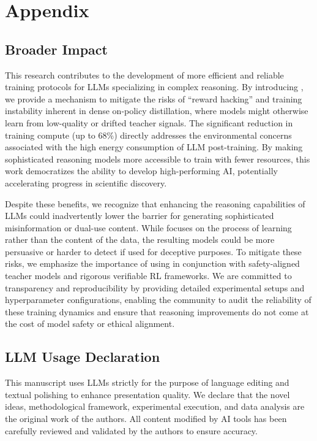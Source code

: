 \section{Appendix}
\subsection{Broader Impact}
\label{app:impact}
This research contributes to the development of more efficient and reliable training protocols for LLMs specializing in complex reasoning. By introducing \method, we provide a mechanism to mitigate the risks of ``reward hacking'' and training instability inherent in dense on-policy distillation, where models might otherwise learn from low-quality or drifted teacher signals. The significant reduction in training compute (up to 68\%) directly addresses the environmental concerns associated with the high energy consumption of LLM post-training. By making sophisticated reasoning models more accessible to train with fewer resources, this work democratizes the ability to develop high-performing AI, potentially accelerating progress in scientific discovery.

Despite these benefits, we recognize that enhancing the reasoning capabilities of LLMs could inadvertently lower the barrier for generating sophisticated misinformation or dual-use content. While \method focuses on the process of learning rather than the content of the data, the resulting models could be more persuasive or harder to detect if used for deceptive purposes. To mitigate these risks, we emphasize the importance of using \method in conjunction with safety-aligned teacher models and rigorous verifiable RL frameworks. We are committed to transparency and reproducibility by providing detailed experimental setups and hyperparameter configurations, enabling the community to audit the reliability of these training dynamics and ensure that reasoning improvements do not come at the cost of model safety or ethical alignment.

\subsection{LLM Usage Declaration}
\label{app:llm_usage}
This manuscript uses LLMs strictly for the purpose of language editing and textual polishing to enhance presentation quality. We declare that the novel ideas, methodological framework, experimental execution, and data analysis are the original work of the authors. All content modified by AI tools has been carefully reviewed and validated by the authors to ensure accuracy.


